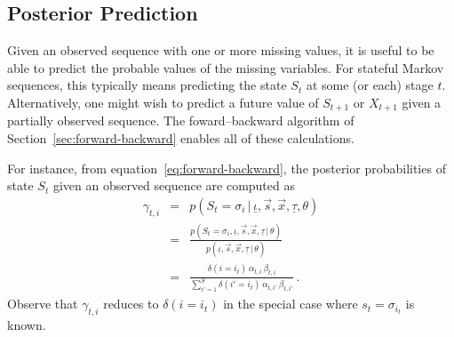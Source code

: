 \documentclass[a4paper]{article}
\begin{document}
\subsection{Posterior Prediction}

Given an observed sequence with one or more missing values, it is useful to be able to predict the probable values of the missing variables.
For stateful Markov sequences, this typically means predicting the state $S_t$ at some (or each) stage $t$.
Alternatively, one might wish to predict a future value of $S_{t+1}$ or $X_{t+1}$ given a partially observed sequence.
The foward--backward algorithm of Section~\ref{sec:forward-backward} enables all of these calculations.

For instance, from equation~\eqref{eq:forward-backward}, the posterior probabilities of state $S_t$ given an observed sequence are computed as
\begin{eqnarray}
   \gamma_{t,i} & = & p(S_t\!=\!\sigma_i\,|\,\underline{\iota},\vec{s},\vec{x},\underline{\tau},\theta)
\nonumber\\& = &
   \frac{p(S_t\!=\!\sigma_i,\underline{\iota},\vec{s},\vec{x},\underline{\tau}\,|\,\theta)}
        {p(\underline{\iota},\vec{s},\vec{x},\underline{\tau}\,|\,\theta)}
\nonumber\\& = &
   \frac{\delta(i=i_t)\,\alpha_{t,i}\,\beta_{t,i}}
        {\sum_{i'=1}^{S}\delta(i'=i_t)\,\alpha_{t,i'}\,\beta_{t,i'}}
\,.
\label{eq:gamma_t_i}
\end{eqnarray}
Observe that $\gamma_{t,i}$ reduces to $\delta(i=i_t)$ in the special case where $s_t=\sigma_{i_t}$ is known.
\end{document}
